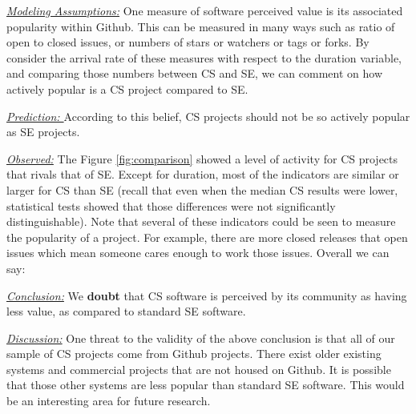 \documentclass[sigconf]{acmart}
\newenvironment{RQ}{\vspace{1mm}\begin{tcolorbox}[enhanced,width=3.4in,size=fbox,colback=red!5!white,drop shadow southeast,sharp corners]}{\end{tcolorbox}}
\begin{document}
\noindent \textit{\underline{Modeling Assumptions:}} 
One measure of software perceived value is its associated popularity within Github. This can be measured in many ways such as ratio of open to closed issues, or
numbers of stars or watchers or tags or forks. By consider the arrival rate of these measures with respect to the duration variable, and comparing those numbers between CS and SE, we can comment on how actively popular is a CS project compared to SE.

\noindent \textit{\underline{Prediction: }} 
According to this belief, CS projects should not be so actively popular as SE projects.



\noindent \textit{\underline{Observed:}} 
The Figure \ref{fig:comparison} showed a
level of activity for CS projects that rivals that of SE.
Except for duration, most of the indicators are similar or larger for CS than SE
(recall that even when the median CS results were lower, statistical tests showed that those differences
were not significantly distinguishable). Note that several of these indicators could be seen
to measure the popularity of a project. For example,
there are more closed releases that open issues which mean someone cares enough to work those issues.
Overall we can say:


\begin{RQ}
\textit{\underline{Conclusion:}} 
We  \textbf{doubt} that CS software is perceived by its community as having less value,
as compared to standard SE software.
\end{RQ}

\noindent \textit{\underline{Discussion:}} 
One threat to the validity of the above conclusion is that all of our sample of CS projects come from Github projects.
 There exist older existing systems and commercial projects that are not housed on Github. It is possible that those other systems are less popular than standard SE software. This would be an interesting area for future research.
  
\end{document}
